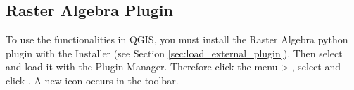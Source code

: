 
\subsection{Raster Algebra Plugin}\label{sec:ftools}

\updatedisclaimer




To use the functionalities in QGIS, you must install the Raster Algebra 
python plugin with the  Installer 
(see Section \ref{sec:load_external_plugin}). Then select and load it 
with the Plugin Manager. Therefore click the menu  > 
, select  and click 
. A new  icon occurs 
in the toolbar.

